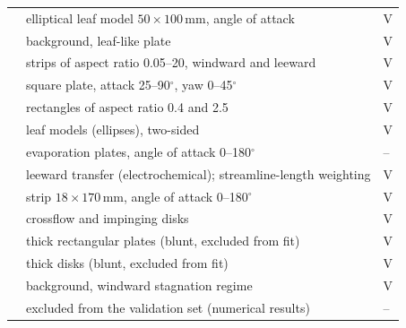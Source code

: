\documentclass[11pt,a4paper]{article}
\begin{document}
{\begin{longtable}{>{\raggedright\arraybackslash}p{3.4cm}>{\raggedright\arraybackslash}p{9.3cm}>{\raggedright\arraybackslash}p{1.8cm}}
\citet{haseba1973} & elliptical leaf model $50\times100$\,mm, angle of attack & V\\
\citet{haseba1974} & background, leaf-like plate & V\\
\citet{haseba1984} & strips of aspect ratio 0.05--20, windward and leeward & V\\
\citet{sparrow1977} & square plate, attack 25--90$^\circ$, yaw 0--45$^\circ$ & V\\
\citet{sparrow1979} & rectangles of aspect ratio 0.4 and 2.5 & V\\
\citet{parkhurst1968} & leaf models (ellipses), two-sided & V\\
\citet{powell1940} & evaporation plates, angle of attack 0--180$^\circ$ & –\\
\citet{schuepp1993} & leeward transfer (electrochemical); streamline-length weighting & V\\
\citet{ramirez2002} & strip $18\times170$\,mm, angle of attack 0--180$^\circ$ & V\\
\citet{kobus2006} & crossflow and impinging disks & V\\
\citet{motwani1985} & thick rectangular plates (blunt, excluded from fit) & V\\
\citet{ausderwiesche2016} & thick disks (blunt, excluded from fit) & V\\
\citet{ausderwiesche2020} & background, windward stagnation regime & V\\
\citet{manna2019} & excluded from the validation set (numerical results) & –\\
\end{longtable}}

\nocite{*}


\end{document}
